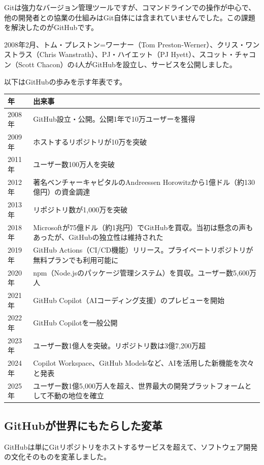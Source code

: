 Gitは強力なバージョン管理ツールですが、コマンドラインでの操作が中心で、他の開発者との協業の仕組みはGit自体には含まれていませんでした。この課題を解決したのがGitHubです。

2008年2月、トム・プレストン=ワーナー（Tom Preston-Werner）、クリス・ワンストラス（Chris Wanstrath）、PJ・ハイエット（PJ Hyett）、スコット・チャコン（Scott Chacon）の4人がGitHubを設立し、サービスを公開しました。

以下はGitHubの歩みを示す年表です。

\begin{table}[htbp]
\centering
\begin{tabular}{lp{11cm}}
\hline
\textbf{年} & \textbf{出来事} \\
\hline
2008年 & GitHub設立・公開。公開1年で10万ユーザーを獲得 \\
2009年 & ホストするリポジトリが10万を突破 \\
2011年 & ユーザー数100万人を突破 \\
2012年 & 著名ベンチャーキャピタルのAndreessen Horowitzから1億ドル（約130億円）の資金調達 \\
2013年 & リポジトリ数が1,000万を突破 \\
2018年 & Microsoftが75億ドル（約1兆円）でGitHubを買収。当初は懸念の声もあったが、GitHubの独立性は維持された \\
2019年 & GitHub Actions（CI/CD機能）リリース。プライベートリポジトリが無料プランでも利用可能に \\
2020年 & npm（Node.jsのパッケージ管理システム）を買収。ユーザー数5,600万人 \\
2021年 & GitHub Copilot（AIコーディング支援）のプレビューを開始 \\
2022年 & GitHub Copilotを一般公開 \\
2023年 & ユーザー数1億人を突破。リポジトリ数は3億7,200万超 \\
2024年 & Copilot Workspace、GitHub Modelsなど、AIを活用した新機能を次々と発表 \\
2025年 & ユーザー数1億5,000万人を超え、世界最大の開発プラットフォームとして不動の地位を確立 \\
\hline
\end{tabular}
\end{table}

\subsection{GitHubが世界にもたらした変革}

GitHubは単にGitリポジトリをホストするサービスを超えて、ソフトウェア開発の文化そのものを変革しました。

